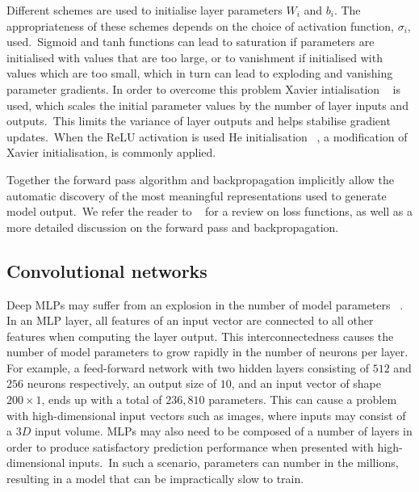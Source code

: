 \medskip
\noindent Different schemes are used to initialise layer parameters $ W_i $ and $ b_i $. The appropriateness of these schemes depends on the choice of activation function, $ \sigma_i $, used.\ Sigmoid and tanh functions can lead to saturation if parameters are initialised with values that are too large, or to vanishment if initialised with values which are too small, which in turn can lead to exploding and vanishing parameter gradients. In order to overcome this problem Xavier intialisation \unskip ~\citep{glorot2010understanding} is used, which scales the initial parameter values by the number of layer inputs and outputs.\ This limits the variance of layer outputs and helps stabilise gradient updates.\ When the ReLU activation is used He initialisation \unskip ~\citep{he2015delving}, a modification of Xavier initialisation, is commonly applied. \par

\noindent Together the forward pass algorithm and backpropagation implicitly allow the automatic discovery of the most meaningful representations used to generate model output.\ We refer the reader to \unskip ~\citep{Goodfellow-et-al-2016} for a review on loss functions, as well as a more detailed discussion on the forward pass and backpropagation. 



\subsection{Convolutional networks}

Deep MLPs may suffer from an explosion in the number of model parameters \unskip ~\citep{krizhevsky2012imagenet}. In an MLP layer, all features of an input vector are connected to all other features when computing the layer output. This interconnectedness causes the number of model parameters to grow rapidly in the number of neurons per layer. For example, a feed-forward network with two hidden layers consisting of $ 512 $ and $ 256 $ neurons respectively, an output size of $10$, and an input vector of shape $ 200 \times 1 $, ends up with a total of $ 236,810 $ parameters. This can cause a problem with high-dimensional input vectors such as images, where inputs may consist of a $ 3D $ input volume. MLPs may also need to be composed of a number of layers in order to produce satisfactory prediction performance when presented with high-dimensional inputs.\ In such a scenario, parameters can number in the millions, resulting in a model that can be impractically slow to train. \par


